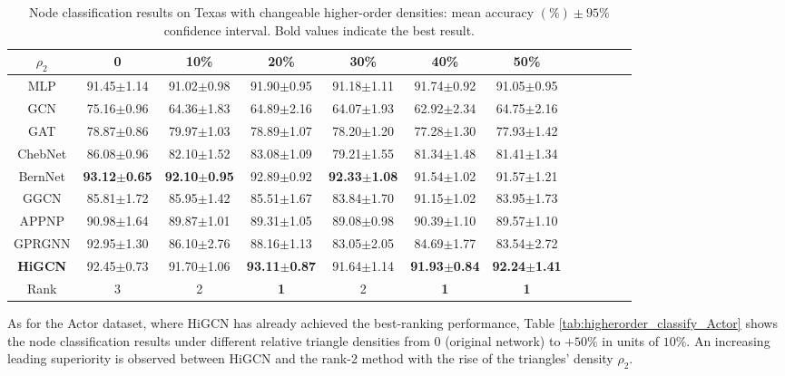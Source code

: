 \documentclass[letterpaper]{article} \usepackage{aaai24}
\newcommand \spm[1] {\footnotesize{$\pm$#1} }
\theoremstyle{plain}
\theoremstyle{definition}
\theoremstyle{remark}
\begin{document}
\begin{table*}[!ht] 
\centering
\begin{tabular}{cccccccccccc}\toprule
$\rho_2$    &0   &10\%   &20\%   &30\%  &40\%  &50\%\\
\midrule
MLP
&91.45\spm{1.14}  &91.02\spm{0.98}  &91.90\spm{0.95}  &91.18\spm{1.11}  &91.74\spm{0.92}  &91.05\spm{0.95}\\
GCN      
&75.16\spm{0.96}  &64.36\spm{1.83}  &64.89\spm{2.16}  &64.07\spm{1.93}  &62.92\spm{2.34}  &64.75\spm{2.16}\\
GAT      
&78.87\spm{0.86}  &79.97\spm{1.03}  &78.89\spm{1.07}  &78.20\spm{1.20}  &77.28\spm{1.30}  &77.93\spm{1.42}\\
ChebNet  
&86.08\spm{0.96}  &82.10\spm{1.52}  &83.08\spm{1.09}  &79.21\spm{1.55}  &81.34\spm{1.48}  &81.41\spm{1.34}\\
BernNet  
&\textbf{93.12\spm{0.65}}  &\textbf{92.10\spm{0.95}}  &92.89\spm{0.92}  &\textbf{92.33\spm{1.08}}  &91.54\spm{1.02}  &91.57\spm{1.21}\\
GGCN  
&85.81\spm{1.72}  &85.95\spm{1.42}  &85.51\spm{1.67}  &83.84\spm{1.70}  &91.15\spm{1.02}  &83.95\spm{1.73}\\
APPNP  
&90.98\spm{1.64}  &89.87\spm{1.01}  &89.31\spm{1.05}  &89.08\spm{0.98}  &90.39\spm{1.10}  &89.57\spm{1.10}\\
GPRGNN 
&92.95\spm{1.30}  &86.10\spm{2.76}  &88.16\spm{1.13}  &83.05\spm{2.05}  &84.69\spm{1.77}  &83.54\spm{2.72}\\
\midrule
\textbf{HiGCN}
&92.45\spm{0.73}  &91.70\spm{1.06}  &\textbf{93.11\spm{0.87}}  &91.64\spm{1.14}  &\textbf{91.93\spm{0.84}} &\textbf{92.24\spm{1.41}}\\
\midrule
Rank
&3  &2  &\textbf{1}  &2  &\textbf{1} &\textbf{1}\\
\bottomrule
\end{tabular}
\caption{Node classification results on Texas with changeable higher-order densities: mean accuracy $(\%)\pm 95\%$ confidence interval. Bold values indicate the best result.}
\label{tab:higherorder_classify_Texas}
\end{table*}






As for the Actor dataset, where HiGCN has already achieved the best-ranking performance, Table \ref{tab:higherorder_classify_Actor} shows the node classification results under different relative triangle densities from 0 (original network) to $+ 50 \%$ in units of $10 \%$.
An increasing leading superiority is observed between HiGCN and the rank-2 method with the rise of the triangles' density $\rho_2$.
\end{document}
